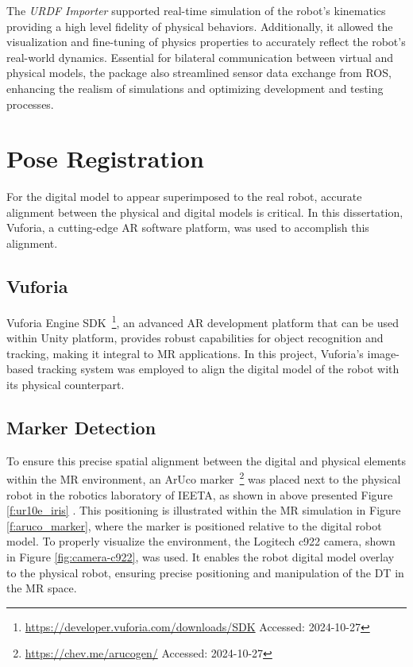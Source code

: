 The \textit{\ac{URDF} Importer} supported real-time simulation of the robot's kinematics providing a high level fidelity of physical behaviors. Additionally, it allowed the visualization and fine-tuning of physics properties to accurately reflect the robot's real-world dynamics. Essential for bilateral communication between virtual and physical models, the package also streamlined sensor data exchange from \ac{ROS}, enhancing the realism of simulations and optimizing development and testing processes.

\section{Pose Registration}
For the digital model to appear superimposed to the real robot, accurate alignment between the physical and digital models is critical. In this dissertation, Vuforia, a cutting-edge \ac{AR} software platform, was used to accomplish this alignment.

\subsection{Vuforia}
\label{section:marker-detection}

Vuforia Engine \ac{SDK}~\footnote{\url{https://developer.vuforia.com/downloads/SDK} Accessed: 2024-10-27}, an advanced \ac{AR} development platform that can be used within Unity platform, provides robust capabilities for object recognition and tracking, making it integral to \ac{MR} applications. In this project, Vuforia's image-based tracking system was employed to align the digital model of the robot with its physical counterpart.

\subsection{Marker Detection}

To ensure this precise spatial alignment between the digital and physical elements within the \ac{MR} environment, an ArUco marker~\footnote{\url{https://chev.me/arucogen/} Accessed: 2024-10-27} was placed next to the physical robot in the robotics laboratory of IEETA, as shown in above presented Figure \ref{f:ur10e_iris} . This positioning is illustrated within the \ac{MR} simulation in Figure \ref{f:aruco_marker}, where the marker is positioned relative to the digital robot model. To properly visualize the environment, the Logitech c922 camera, shown in Figure \ref{fig:camera-c922}, was used. It enables the robot digital model overlay to the physical robot, ensuring precise positioning and manipulation of the \ac{DT} in the \ac{MR} space.

